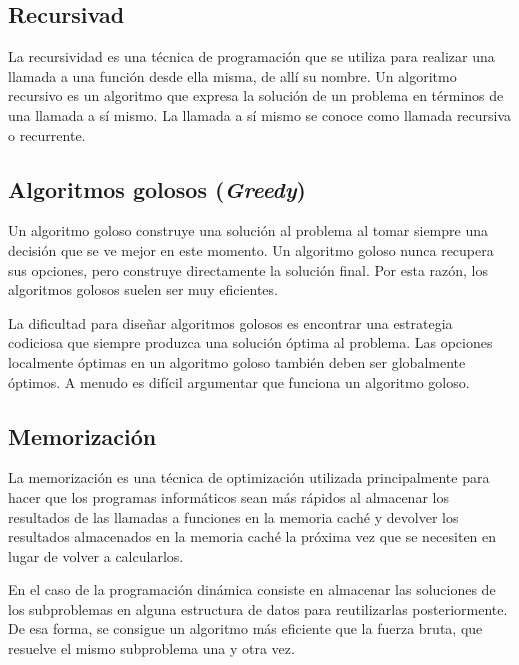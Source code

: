 \subsection{Recursivad}

La recursividad es una técnica de programación que se utiliza para realizar una llamada a una
 función desde ella misma, de allí su nombre. Un algoritmo recursivo es un algoritmo que expresa
la solución de un problema en términos de una llamada a sí mismo. La llamada a sí mismo se
conoce como llamada recursiva o recurrente.

\subsection{Algoritmos golosos (\emph{Greedy})}
Un algoritmo goloso construye una solución al problema al tomar siempre una decisión que
 se ve mejor en este momento. Un algoritmo goloso nunca recupera sus opciones, pero construye
 directamente la solución final. Por esta razón, los algoritmos golosos suelen ser muy eficientes.

La dificultad para diseñar algoritmos golosos es encontrar una estrategia codiciosa que siempre
 produzca una solución óptima al problema. Las opciones localmente óptimas en un algoritmo
goloso también deben ser globalmente óptimos. A menudo es difícil argumentar que funciona un algoritmo goloso.

\subsection{Memorización}

La memorización es una técnica de optimización utilizada principalmente para hacer que los programas informáticos sean más rápidos al almacenar los resultados de las llamadas a funciones en la memoria caché y devolver los resultados almacenados en la memoria caché la próxima vez que se necesiten en lugar de volver a calcularlos. 

En el caso de la programación dinámica consiste en almacenar las soluciones de los subproblemas en alguna estructura de datos para reutilizarlas posteriormente. De esa forma, se consigue un algoritmo más eficiente que la fuerza bruta, que resuelve el mismo subproblema una y otra vez.